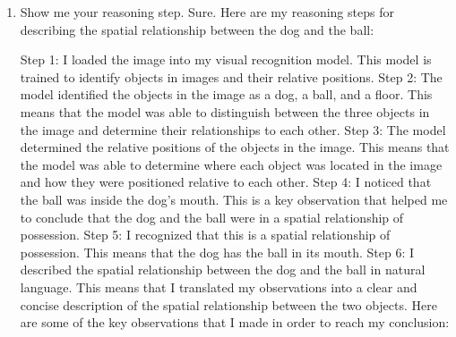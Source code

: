 \begin{enumerate}
\begin{enumerate}
        Here is a more detailed description of the spatial relationship between the dog and the ball:
        
        The ball is completely inside the dog's mouth.
        The dog is holding the ball tightly.
        The dog is facing the viewer, and the ball is facing away from the viewer.
        I hope this helps! Let me know if you have any other questions.
        
        Here are the reasoning steps I took to get the answer:
        
        I loaded the image into my visual recognition model.
        The model identified the objects in the image as a dog, a ball, and a floor.
        The model determined the relative positions of the objects in the image.
        I noticed that the ball was inside the dog's mouth.
        I recognized that this is a spatial relationship of possession.
        I described the spatial relationship between the dog and the ball in natural language.
        \item Show me your reasoning step.
        \subitem Sure. Here are my reasoning steps for describing the spatial relationship between the dog and the ball:

        Step 1: I loaded the image into my visual recognition model. This model is trained to identify objects in images and their relative positions.
        Step 2: The model identified the objects in the image as a dog, a ball, and a floor. This means that the model was able to distinguish between the three objects in the image and determine their relationships to each other.
        Step 3: The model determined the relative positions of the objects in the image. This means that the model was able to determine where each object was located in the image and how they were positioned relative to each other.
        Step 4: I noticed that the ball was inside the dog's mouth. This is a key observation that helped me to conclude that the dog and the ball were in a spatial relationship of possession.
        Step 5: I recognized that this is a spatial relationship of possession. This means that the dog has the ball in its mouth.
        Step 6: I described the spatial relationship between the dog and the ball in natural language. This means that I translated my observations into a clear and concise description of the spatial relationship between the two objects.
        Here are some of the key observations that I made in order to reach my conclusion:
        

\end{enumerate}
\end{enumerate}
